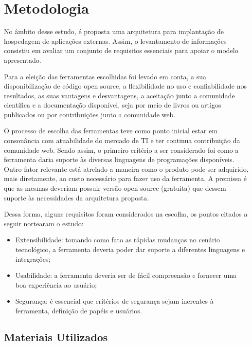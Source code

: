 



\chapter{Metodologia}\label{cap:metodologia}

No âmbito desse estudo, é proposta uma arquitetura para implantação de hospedagem de aplicações externas. Assim, o levantamento de informações consistiu em avaliar um conjunto de requisitos essenciais para apoiar o modelo apresentado.

Para a eleição das ferramentas escolhidas foi levado em conta, a sua disponibilização de código open source, a flexibilidade no uso e confiabilidade nos resultados, as suas vantagens e desvantagens, a aceitação junto a comunidade científica e a documentação disponível, seja por meio de livros ou artigos publicados ou por contribuições junto a comunidade web.

O processo de escolha das ferramentas teve como ponto inicial estar em consonância com atuabilidade do mercado de TI e ter continua contribuição da comunidade web. Sendo assim, o primeiro critério a ser considerado foi como a ferramenta daria suporte às diversas linguagens de programações disponíveis. Outro fator relevante está atrelado a maneira como o produto pode ser adquirido, mais diretamente, ao custo necessário para fazer uso da ferramenta. A premissa é que as mesmas deveriam possuir versão open source (gratuita) que  dessem suporte às necessidades da arquitetura proposta.

Dessa forma, alguns requisitos foram considerados na escolha, os pontos citados a seguir nortearam o estudo: 

\begin{itemize}
	
	\item Extensibilidade: tomando como fato as rápidas mudanças no cenário tecnológico, a ferramenta deveria poder dar suporte a diferentes linguagens e integrações;
	\item Usabilidade: a ferramenta deveria ser de fácil compreensão e fornecer uma boa experiência ao usuário;
	\item Segurança: é essencial que critérios de segurança sejam inerentes à ferramenta, definição de papéis e usuários.
	
\end{itemize}


\section{Materiais Utilizados}

